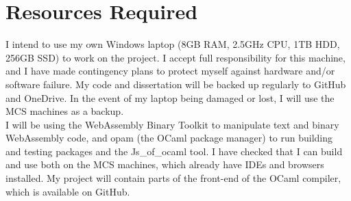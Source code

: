 \documentclass[12pt]{article}
\begin{document}
\section*{Resources Required}
I intend to use my own Windows laptop (8GB RAM, 2.5GHz CPU, 1TB HDD, 256GB SSD) to work on the project. I accept full responsibility for this machine, and I have made contingency plans to protect myself against hardware and/or software failure. My code and dissertation will be backed up regularly to GitHub and OneDrive. In the event of my laptop being damaged or lost, I will use the MCS machines as a backup. \\
I will be using the WebAssembly Binary Toolkit to manipulate text and binary WebAssembly code, and opam (the OCaml package manager) to run building and testing packages and the Js\_of\_ocaml tool. I have checked that I can build and use both on the MCS machines, which already have IDEs and browsers installed. My project will contain parts of the front-end of the OCaml compiler, which is available on GitHub. %

\end{document}
